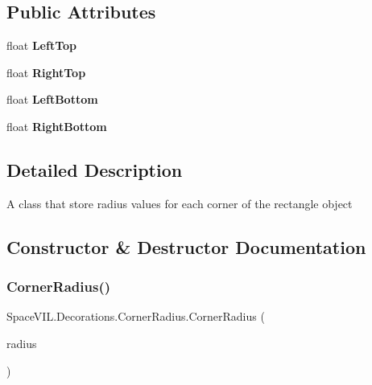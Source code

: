 \subsection*{Public Attributes}
\begin{DoxyCompactItemize}
\item 
\mbox{\label{class_space_v_i_l_1_1_decorations_1_1_corner_radius_a245fa87a1e61e48df633b9e683257e2d}} 
float {\bfseries Left\+Top}
\item 
\mbox{\label{class_space_v_i_l_1_1_decorations_1_1_corner_radius_a33def3bbda9509de1d24d4538ea1cca6}} 
float {\bfseries Right\+Top}
\item 
\mbox{\label{class_space_v_i_l_1_1_decorations_1_1_corner_radius_a4f78c1c3483160b8bad0d86db905bdac}} 
float {\bfseries Left\+Bottom}
\item 
\mbox{\label{class_space_v_i_l_1_1_decorations_1_1_corner_radius_ac0ae03b307069eb2c649b60573826c07}} 
float {\bfseries Right\+Bottom}
\end{DoxyCompactItemize}


\subsection{Detailed Description}
A class that store radius values for each corner of the rectangle object 



\subsection{Constructor \& Destructor Documentation}
\mbox{\label{class_space_v_i_l_1_1_decorations_1_1_corner_radius_ada9a5a6f3e04d10e5ea65ffa6692b61c}} 
\subsubsection{\texorpdfstring{Corner\+Radius()}{CornerRadius()}\hspace{0.1cm}{\footnotesize\ttfamily [1/3]}}
{\footnotesize\ttfamily Space\+V\+I\+L.\+Decorations.\+Corner\+Radius.\+Corner\+Radius (\begin{DoxyParamCaption}\item[{\mbox{\hyperlink{class_space_v_i_l_1_1_decorations_1_1_corner_radius}{Corner\+Radius}}}]{radius }\end{DoxyParamCaption})\hspace{0.3cm}{\ttfamily [inline]}}



